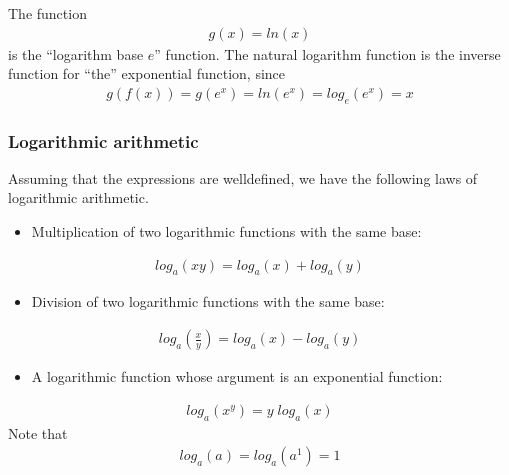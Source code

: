\documentclass[letterpaper,10pt,english]{jupyterBook}
\begin{document}
\sphinxAtStartPar
The function
\begin{equation*}
\begin{split} g(x) = ln(x) \end{split}
\end{equation*}
\sphinxAtStartPar
is the “logarithm base \(e\)” function. The natural logarithm function is the inverse function for “the” exponential function, since
\begin{equation*}
\begin{split} g(f(x)) = g(e^x) = ln(e^x) = log_e(e^x) = x \end{split}
\end{equation*}
\sphinxAtStartPar
{}


\subsubsection{Logarithmic arithmetic}
\label{\detokenize{03.mappings_functions_correspondences:logarithmic-arithmetic}}
\sphinxAtStartPar
Assuming that the expressions are well\sphinxhyphen{}defined, we have the following
laws of logarithmic arithmetic.
\begin{itemize}
\item {} 
\sphinxAtStartPar
Multiplication of two logarithmic functions with the same base:

\end{itemize}
\begin{equation*}
\begin{split} log_a(xy) = log_a(x) + log_a(y) \end{split}
\end{equation*}\begin{itemize}
\item {} 
\sphinxAtStartPar
Division of two logarithmic functions with the same base:

\end{itemize}
\begin{equation*}
\begin{split}log_a \left( \frac{x}{y} \right) =  log_a(x) − log_a(y) \end{split}
\end{equation*}\begin{itemize}
\item {} 
\sphinxAtStartPar
A logarithmic function whose argument is an exponential function:

\end{itemize}
\begin{equation*}
\begin{split}log_a(x^y) = y \; log_a(x)\end{split}
\end{equation*}
\sphinxAtStartPar
Note that
\begin{equation*}
\begin{split}log_a(a) = log_a(a^1) = 1\end{split}
\end{equation*}
\end{document}
